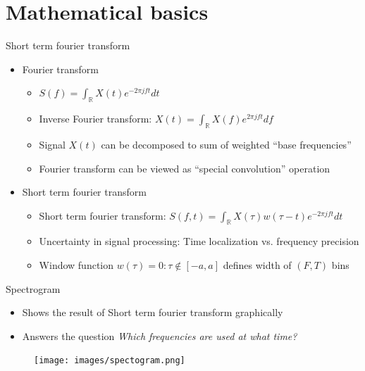 \documentclass[xcolor=table,mathserif,9pt]{beamer}    %
\begin{document}
\section{Mathematical basics}%
\label{sec:mathematical_basics}
\begin{frame}{Short term fourier transform}

\begin{itemize}
	\setlength\itemsep{1em}
	\item Fourier transform 
	\begin{itemize}
		\item $S(f) = \int_{\mathbb{R}}X(t)e^{-2{\pi}jft}dt$
		\item Inverse Fourier transform: $X(t) = \int_{\mathbb{R}}X(f)e^{2{\pi}jft}df$
		\item Signal $X(t)$ can be decomposed to sum of weighted ``base frequencies''
		\item Fourier transform can be viewed as ``special convolution'' operation
	\end{itemize}
	\item Short term fourier transform
	\begin{itemize}
		\item Short term fourier transform: $S(f,t) = \int_{\mathbb{R}}X(\tau)w(\tau - t)e^{-2{\pi}jft}dt$ 
		\item Uncertainty in signal processing: Time localization vs. frequency precision
		\item Window function $w(\tau) = 0: \tau \not \in \left[-a, a \right]$ defines width of $(F,T)$ bins 
	\end{itemize}
\end{itemize}


\end{frame}

\begin{frame}{Spectrogram}

\begin{itemize}
	\item Shows the result of Short term fourier transform graphically
	\item Answers the question \emph{Which frequencies are used at what time?}
\end{itemize}

\begin{center}
	\begin{figure}
		\texttt{[image: images/spectogram.png]}
	\end{figure}
\end{center}

\end{frame}
\end{document}
